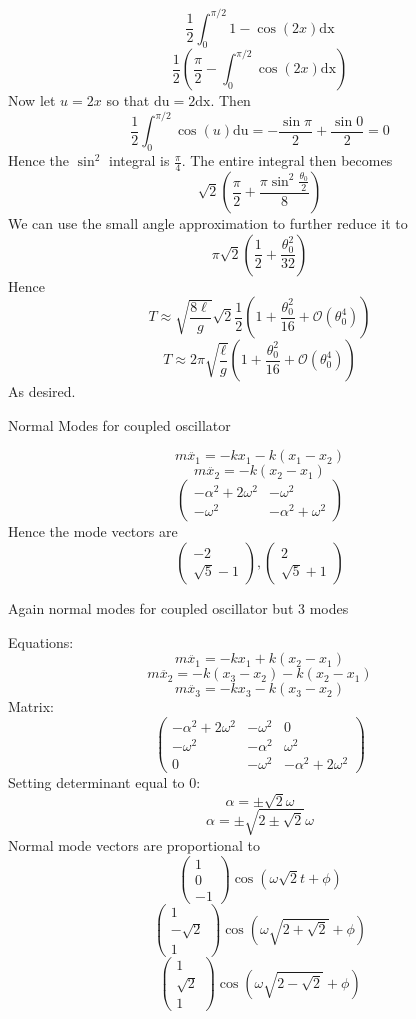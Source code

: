 \documentclass[11pt]{scrartcl}
\newcommand{\ca}[1]{\mathrm{#1}}
\begin{document}
\begin{soln}
  $$\frac{1}{2}\int_0^{\pi/2}1-\cos(2x)\ca{dx}$$
  $$\frac{1}{2}\left(\frac{\pi}{2}-\int_0^{\pi/2}\cos(2x)\ca{dx}\right)$$
  Now let $u=2x$ so that $\ca{du}=2\ca{dx}$. Then
  $$\frac{1}{2}\int_0^{\pi/2}\cos(u)\ca{du}=-\frac{\sin\pi}{2}+\frac{\sin 0}{2}=0$$
  Hence the $\sin^2$ integral is $\frac{\pi}{4}$. The entire integral then becomes
  $$\sqrt{2}\left(\frac{\pi}{2}+\frac{\pi \sin^2\frac{\theta_0}{2}}{8}\right)$$
  We can use the small angle approximation to further reduce it to
  $$\pi\sqrt{2}\left(\frac{1}{2}+\frac{\theta_0^2}{32}\right)$$
  Hence
  $$T\approx \sqrt{\frac{8\ell}{g}}\sqrt{2}\frac{1}{2}\left(1+\frac{\theta_0^2}{16}+\mathcal{O}(\theta_0^4)\right)$$
  $$T\approx 2\pi \sqrt{\frac{\ell}{g}}\left(1+\frac{\theta_0^2}{16}+\mathcal{O}(\theta_0^4)\right)$$
  As desired.
\end{soln}
\begin{example}
  [4.31]
  Normal Modes for coupled oscillator
\end{example}
\begin{soln}
  $$m\ddot{x_1}=-kx_1-k(x_1-x_2)$$
  $$m\ddot{x_2}=-k(x_2-x_1)$$
  $$\begin{pmatrix}-\alpha^2+2\omega^2 & -\omega^2 \\ -\omega^2 & -\alpha^2+\omega^2\end{pmatrix}$$
  Hence the mode vectors are
  $$\begin{pmatrix}-2 \\ \sqrt{5}-1\end{pmatrix}, \begin{pmatrix} 2 \\ \sqrt{5}+1\end{pmatrix}$$
\end{soln}
\begin{example}
  [4.32]
  Again normal modes for coupled oscillator but 3 modes
\end{example}
\begin{soln}
  Equations:
  $$m\ddot{x_1}=-kx_1+k(x_2-x_1)$$
  $$m\ddot{x_2}=-k(x_3-x_2)-k(x_2-x_1)$$
  $$m\ddot{x_3}=-kx_3-k(x_3-x_2)$$
  Matrix:
  $$\begin{pmatrix}-\alpha^2+2\omega^2 & -\omega^2 & 0 \\ -\omega^2 & -\alpha^2 & \omega^2 \\ 0 & -\omega^2 & -\alpha^2+2\omega^2\end{pmatrix}$$
  Setting determinant equal to $0$:
  $$\alpha=\pm \sqrt{2}\omega$$
  $$\alpha=\pm \sqrt{2\pm \sqrt{2}}\omega$$
  Normal mode vectors are proportional to
  $$\begin{pmatrix}1 \\ 0 \\ -1\end{pmatrix}\cos(\omega \sqrt{2}t+\phi)$$
  $$\begin{pmatrix}1 \\ -\sqrt{2} \\ 1\end{pmatrix}\cos(\omega \sqrt{2+\sqrt{2}}+\phi)$$
  $$\begin{pmatrix}1 \\ \sqrt{2} \\ 1\end{pmatrix}\cos(\omega \sqrt{2-\sqrt{2}}+\phi)$$
\end{soln}
\end{document}
